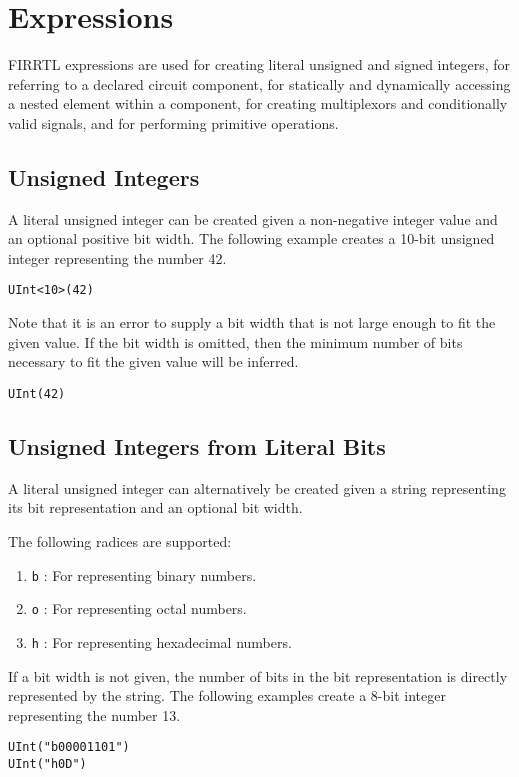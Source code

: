 \documentclass[12pt]{article}
\begin{document}
\section{Expressions}

FIRRTL expressions are used for creating literal unsigned and signed integers, for referring to a declared circuit component, for statically and dynamically accessing a nested element within a component, for creating multiplexors and conditionally valid signals, and for performing primitive operations. 

\subsection{Unsigned Integers}

A literal unsigned integer can be created given a non-negative integer value and an optional positive bit width. The following example creates a 10-bit unsigned integer representing the number 42. 
\begin{lstlisting}
UInt<10>(42)
\end{lstlisting}

Note that it is an error to supply a bit width that is not large enough to fit the given value. If the bit width is omitted, then the minimum number of bits necessary to fit the given value will be inferred.
\begin{lstlisting}
UInt(42)
\end{lstlisting}

\subsection{Unsigned Integers from Literal Bits}

A literal unsigned integer can alternatively be created given a string representing its bit representation and an optional bit width. 

The following radices are supported:
\begin{enumerate}
\item \verb|b| : For representing binary numbers.
\item \verb|o| : For representing octal numbers.
\item \verb|h| : For representing hexadecimal numbers.
\end{enumerate}

If a bit width is not given, the number of bits in the bit representation is directly represented by the string. The following examples create a 8-bit integer representing the number 13.
\begin{lstlisting}
UInt("b00001101")
UInt("h0D")
\end{lstlisting}
\end{document}
